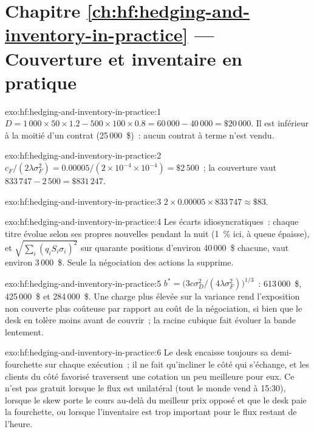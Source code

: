 \section*{Chapitre \ref{ch:hf:hedging-and-inventory-in-practice} --- Couverture et inventaire en pratique}

\begin{solution}{exo:hf:hedging-and-inventory-in-practice:1}
$D=1\,000\times50\times1.2-500\times100\times0.8=60\,000-40\,000=\$20\,000$. Il est inférieur à la moitié d'un contrat (25\,000~\$)~: aucun contrat à terme n'est vendu.
\end{solution}

\begin{solution}{exo:hf:hedging-and-inventory-in-practice:2}
$c_F/(2\lambda\sigma_F^2)=0.00005/(2\times10^{-4}\times10^{-4})=\$2\,500$~; la couverture vaut $833\,747-2\,500=\$831\,247$.
\end{solution}

\begin{solution}{exo:hf:hedging-and-inventory-in-practice:3}
$2\times0.00005\times833\,747\approx\$83$.
\end{solution}

\begin{solution}{exo:hf:hedging-and-inventory-in-practice:4}
Les écarts idiosyncratiques~: chaque titre évolue selon ses propres nouvelles pendant la nuit (1~\% ici, à queue épaisse), et $\sqrt{\sum_i(q_iS_i\sigma_i)^2}$ sur quarante positions
d'environ 40\,000~\$ chacune, vaut environ 3\,000~\$. Seule la négociation des actions la supprime.
\end{solution}

\begin{solution}{exo:hf:hedging-and-inventory-in-practice:5}
$b^\ast=\bigl(3c\sigma_D^2/(4\lambda\sigma_F^2)\bigr)^{1/3}$~: 613\,000~\$, 425\,000~\$ et 284\,000~\$. Une charge plus élevée sur la variance rend l'exposition non couverte
plus coûteuse par rapport au coût de la négociation, si bien que le desk en tolère moins avant de couvrir~; la racine cubique fait évoluer la bande lentement.
\end{solution}

\begin{solution}{exo:hf:hedging-and-inventory-in-practice:6}
Le desk encaisse toujours sa demi-fourchette sur chaque exécution~; il ne fait qu'incliner le côté qui s'échange, et les clients du côté favorisé traversent une cotation un peu
meilleure pour eux. Ce n'est pas gratuit lorsque le flux est unilatéral (tout le monde vend à 15:30), lorsque le skew porte le cours au-delà du meilleur prix opposé et que le
desk paie la fourchette, ou lorsque l'inventaire est trop important pour le flux restant de l'heure.
\end{solution}

